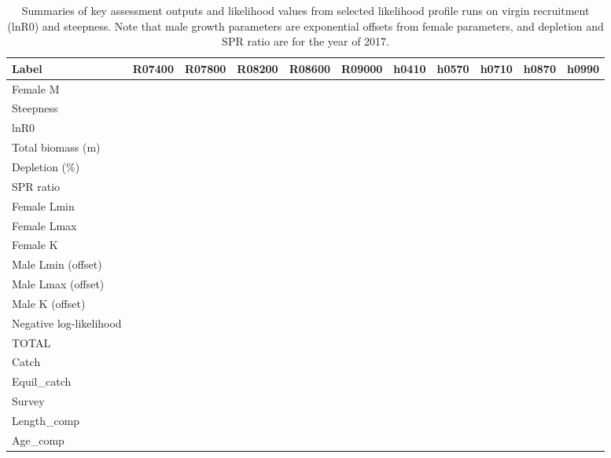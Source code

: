 \documentclass[12pt,]{article}
\begin{document}
\newpage

\begin{landscape}
\begin{table}[ht]
\centering
\caption{Summaries of key assessment outputs 
                                              and likelihood values from selected 
                                              likelihood profile runs on virgin 
                                              recruitment (lnR0) and steepness.  Note that male 
                                              growth parameters are exponential 
                                              offsets from female parameters, and 
                                              depletion and SPR ratio are for the year of 2017.} 
\label{tab:like_profiles}
\begin{tabular}{l|ccccc|ccccc}
  \hline
Label & R07400 & R07800 & R08200 & R08600 & R09000 & h0410 & h0570 & h0710 & h0870 & h0990 \\ 
  \hline
Female M &  &  &  &  &  &  &  &  &  &  \\ 
  Steepness &  &  &  &  &  &  &  &  &  &  \\ 
  lnR0 &  &  &  &  &  &  &  &  &  &  \\ 
  Total biomass (m) &  &  &  &  &  &  &  &  &  &  \\ 
  Depletion (\%) &  &  &  &  &  &  &  &  &  &  \\ 
  SPR ratio &  &  &  &  &  &  &  &  &  &  \\ 
  Female Lmin &  &  &  &  &  &  &  &  &  &  \\ 
  Female Lmax &  &  &  &  &  &  &  &  &  &  \\ 
  Female K &  &  &  &  &  &  &  &  &  &  \\ 
  Male Lmin (offset) &  &  &  &  &  &  &  &  &  &  \\ 
  Male Lmax (offset) &  &  &  &  &  &  &  &  &  &  \\ 
  Male K (offset) &  &  &  &  &  &  &  &  &  &  \\ 
  Negative log-likelihood &  &  &  &  &  &  &  &  &  &  \\ 
  TOTAL &  &  &  &  &  &  &  &  &  &  \\ 
  Catch &  &  &  &  &  &  &  &  &  &  \\ 
  Equil\_catch &  &  &  &  &  &  &  &  &  &  \\ 
  Survey &  &  &  &  &  &  &  &  &  &  \\ 
  Length\_comp &  &  &  &  &  &  &  &  &  &  \\ 
  Age\_comp &  &  &  &  &  &  &  &  &  &  \\ 

\end{tabular}
\end{table}
\end{landscape}
\end{document}
